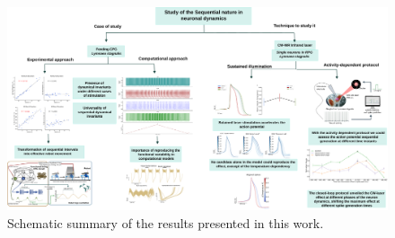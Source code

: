 \begin{figure}[htb!]
	\includegraphics[width=\textwidth]{img/panel discussion.pdf}
	\caption{Schematic summary of the results presented in this work.}
	\label{fig:summary conlusions}
\end{figure}

